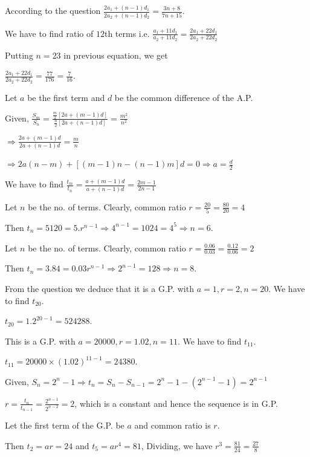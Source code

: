   According to the question $\frac{2a_1 + (n - 1)d_1}{2a_2 + (n - 1)d_2} = \frac{3n + 8}{7n + 15}$.

  We have to find ratio of $12$th terms i.e. $\frac{a_1 + 11d_1}{a_2 + 11d_2} = \frac{2a_1 + 22d_1}{2a_2 + 22d_2}$

  Putting $n = 23$ in previous equation, we get

  $\frac{2a_1 + 22d_1}{2a_2 + 22d_2} = \frac{77}{176} = \frac{7}{16}$.
\item Let $a$ be the first term and $d$ be the common difference of the A.P.

  Given, $\frac{S_m}{S_n} = \frac{\tfrac{m}{2}[2a + (m - 1)d]}{\tfrac{n}{2}[2a + (n - 1)d]} = \frac{m^2}{n^2}$

  $\Rightarrow \frac{2a + (m - 1)d}{2a + (n - 1)d} = \frac{m}{n}$

  $\Rightarrow 2a(n - m) + [(m - 1)n - (n - 1)m]d = 0 \Rightarrow a = \frac{d}{2}$

  We have to find $\frac{t_m}{t_n} = \frac{a + (m - 1)d}{a + (n - 1)d} = \frac{2m - 1}{2n - 1}$
\item Let $n$ be the no. of terms. Clearly, common ratio $r = \frac{20}{5} = \frac{80}{20} = 4$

  Then $t_n = 5120 = 5.r^{n - 1} \Rightarrow 4^{n - 1} = 1024 = 4^5 \Rightarrow n = 6$.
\item Let $n$ be the no. of terms. Clearly, common ratio $r = \frac{0.06}{0.03} = \frac{0.12}{0.06} = 2$

  Then $t_n = 3.84 = 0.03r^{n - 1} \Rightarrow 2^{n - 1} = 128 \Rightarrow n = 8$.
\item From the question we deduce that it is a G.P. with $a = 1, r = 2, n = 20$. We have to find $t_{20}$.

  $t_{20} = 1.2^{20 - 1} = 524288$.
\item This is a G.P. with $a = 20000, r = 1.02, n = 11$. We have to find $t_{11}$.

  $t_{11} = 20000\times(1.02)^{11 - 1} = 24380$.
\item Given, $S_n = 2^n - 1 \Rightarrow t_n = S_n - S_{n - 1} = 2^n - 1 - (2^{n - 1} - 1) = 2^{n - 1}$

  $r = \frac{t_n}{t_{n - 1}} = \frac{2^{n - 1}}{2^{n - 2}} = 2$, which is a constant and hence the sequence is in G.P.
\item Let the first term of the G.P. be $a$ and common ratio is $r$.

  Then $t_2 = ar = 24$ and $t_5 = ar^4 = 81$, Dividing, we have $r^3 = \frac{81}{24} = \frac{27}{8}$

